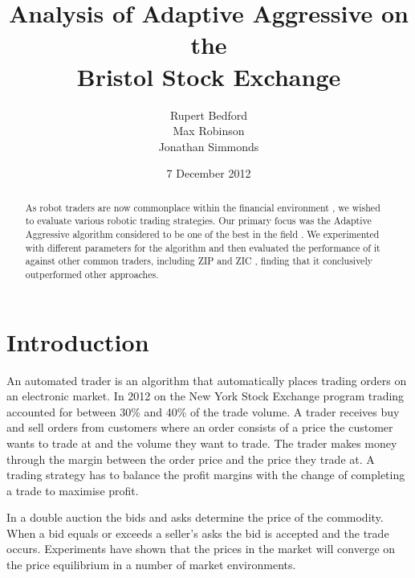 \documentclass[preprint]{acm_proc_article-sp} %
\begin{document}
\title{Analysis of Adaptive Aggressive on the\\
Bristol Stock Exchange}
\author{
  \alignauthor
    Rupert Bedford\\
  \alignauthor
    Max Robinson\\
  \alignauthor
    Jonathan Simmonds
}
\date{7 December 2012}

\maketitle
\begin{abstract}
As robot traders are now commonplace within the financial environment
\cite{nyse_press}, we
wished to evaluate various robotic trading strategies. Our primary focus was
the  Adaptive Aggressive algorithm considered to be one of the
best in the field \cite{AA_thesis}. We experimented with different parameters for the algorithm
and then evaluated the performance of it against other common traders,
including ZIP and ZIC \cite{ZIP_paper1}, finding that it conclusively
outperformed other approaches.
\end{abstract}

\section{Introduction} \label{sec:introduction}

An automated trader is an algorithm that automatically places trading orders on
an electronic market. In 2012 on the New York Stock Exchange program trading accounted for between 
30\% and 40\% of the trade volume\cite{nyse_press}.
A trader receives buy and sell orders from customers where an order consists of a price the customer 
wants to trade at and the volume they want to trade.
The trader makes money through the margin between the order price and the price they trade at.
A trading strategy has to balance the profit margins with the change of completing a trade to maximise profit.

In a double auction the bids and asks determine the price of the commodity.
When a bid equals or exceeds a seller's asks the bid is accepted and the trade
occurs. Experiments have shown  that the prices in the market will
 converge on the price equilibrium in a number of market
environments\cite{smith_1962}.
\end{document}
